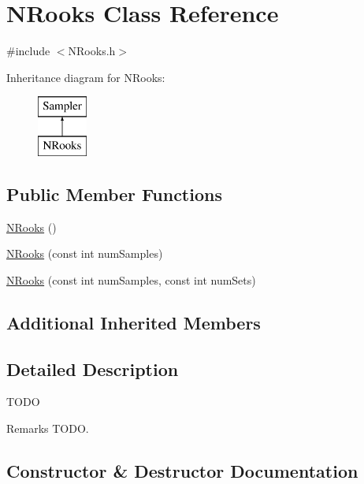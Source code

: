 \hypertarget{class_n_rooks}{}\section{N\+Rooks Class Reference}
\label{class_n_rooks}


{\ttfamily \#include $<$N\+Rooks.\+h$>$}

Inheritance diagram for N\+Rooks\+:\begin{figure}[H]
\begin{center}
\leavevmode
\includegraphics[height=2.000000cm]{class_n_rooks}
\end{center}
\end{figure}
\subsection*{Public Member Functions}
\begin{DoxyCompactItemize}
\item 
\hyperlink{class_n_rooks_af718469f67388fb083d7c140347dd90e}{N\+Rooks} ()
\item 
\hyperlink{class_n_rooks_a927f85bd26be336f880f9b4e033d1cea}{N\+Rooks} (const int num\+Samples)
\item 
\hyperlink{class_n_rooks_a79ca631d81a4b42d319cd2582bb39d8c}{N\+Rooks} (const int num\+Samples, const int num\+Sets)
\end{DoxyCompactItemize}
\subsection*{Additional Inherited Members}


\subsection{Detailed Description}
T\+O\+DO \begin{DoxyRemark}{Remarks}
T\+O\+DO. 
\end{DoxyRemark}


\subsection{Constructor \& Destructor Documentation}
\hypertarget{class_n_rooks_af718469f67388fb083d7c140347dd90e}{}\label{class_n_rooks_af718469f67388fb083d7c140347dd90e} 
